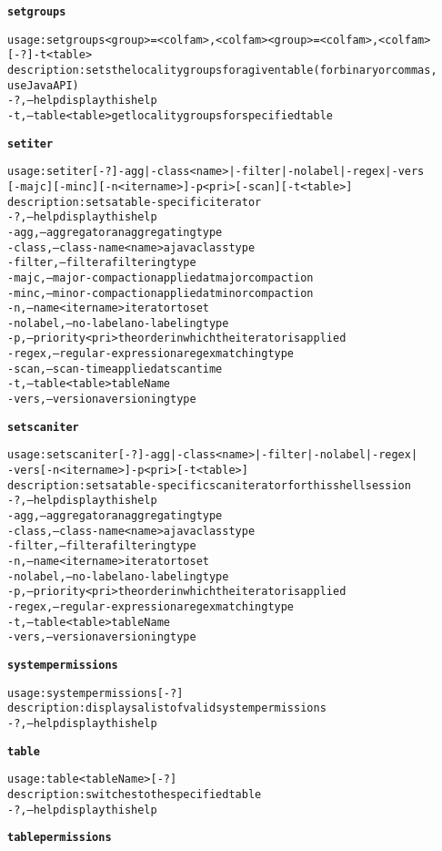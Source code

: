 \begin{alltt}
\textbf{setgroups}

    usage: setgroups <group>=<col fam>{,<col fam>}{ <group>=<col fam>{,<col fam>}}
    	      [-?] -t <table>
    description: sets the locality groups for a given table (for binary or commas,
    	      use Java API)
      -?,--help  display this help
      -t,--table <table>  get locality groups for specified table

\textbf{setiter}

    usage: setiter [-?] -agg | -class <name> | -filter | -nolabel | -regex | -vers 
    	      [-majc] [-minc] [-n <itername>]  -p <pri>  [-scan] [-t <table>]
    description: sets a table-specific iterator
      -?,--help  display this help
      -agg,--aggregator  an aggregating type
      -class,--class-name <name>  a java class type
      -filter,--filter  a filtering type
      -majc,--major-compaction  applied at major compaction
      -minc,--minor-compaction  applied at minor compaction
      -n,--name <itername>	iterator to set
      -nolabel,--no-label  a no-labeling type
      -p,--priority <pri>  the order in which the iterator is applied
      -regex,--regular-expression  a regex matching type
      -scan,--scan-time  applied at scan time
      -t,--table <table>  tableName
      -vers,--version  a versioning type

\textbf{setscaniter}

    usage: setscaniter [-?] -agg | -class <name> | -filter | -nolabel | -regex |
    	      -vers  [-n <itername>]  -p <pri>	[-t <table>]
    description: sets a table-specific scan iterator for this shell session
      -?,--help  display this help
      -agg,--aggregator  an aggregating type
      -class,--class-name <name>  a java class type
      -filter,--filter  a filtering type
      -n,--name <itername>	iterator to set
      -nolabel,--no-label  a no-labeling type
      -p,--priority <pri>  the order in which the iterator is applied
      -regex,--regular-expression  a regex matching type
      -t,--table <table>  tableName
      -vers,--version  a versioning type

\textbf{systempermissions}

    usage: systempermissions [-?]
    description: displays a list of valid system permissions
      -?,--help  display this help

\textbf{table}

    usage: table <tableName> [-?]
    description: switches to the specified table
      -?,--help  display this help

\textbf{tablepermissions}


\end{alltt}
